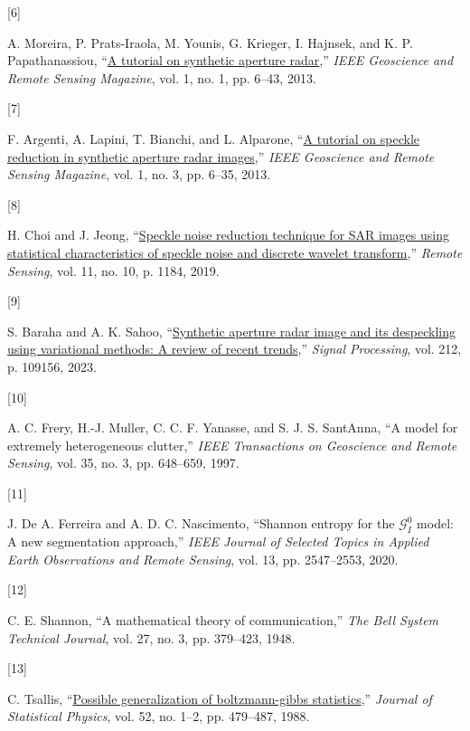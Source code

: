 \documentclass[
  lettersize  journal,
]{IEEEtran}%
\newlength{\cslhangindent}
\newlength{\csllabelwidth}
\newenvironment{CSLReferences}[2] %
 {\begin{list}{}{%
  \setlength{\itemindent}{0pt}
  \setlength{\leftmargin}{0pt}
  \setlength{\parsep}{0pt}
  \ifodd #1
   \setlength{\leftmargin}{\cslhangindent}
   \setlength{\itemindent}{-1\cslhangindent}
  \fi
  \setlength{\itemsep}{#2\baselineskip}}}
 {\end{list}}
\newcommand{\CSLLeftMargin}[1]{\parbox[t]{\csllabelwidth}{\strut#1\strut}}
\newcommand{\CSLRightInline}[1]{\parbox[t]{\linewidth - \csllabelwidth}{\strut#1\strut}}
\begin{document}
\begin{CSLReferences}{0}{0}
\CSLLeftMargin{{[}6{]} }%
\CSLRightInline{A. Moreira, P. Prats-Iraola, M. Younis, G. Krieger, I.
Hajnsek, and K. P. Papathanassiou,
{``\href{https://doi.org/10.1109/mgrs.2013.2248301}{A tutorial on
synthetic aperture radar},''} \emph{IEEE Geoscience and Remote Sensing
Magazine}, vol. 1, no. 1, pp. 6--43, 2013. }

\CSLLeftMargin{{[}7{]} }%
\CSLRightInline{F. Argenti, A. Lapini, T. Bianchi, and L. Alparone,
{``\href{https://doi.org/10.1109/mgrs.2013.2277512}{A tutorial on
speckle reduction in synthetic aperture radar images},''} \emph{IEEE
Geoscience and Remote Sensing Magazine}, vol. 1, no. 3, pp. 6--35, 2013.
}

\CSLLeftMargin{{[}8{]} }%
\CSLRightInline{H. Choi and J. Jeong,
{``\href{https://doi.org/10.3390/rs11101184}{Speckle noise reduction
technique for SAR images using statistical characteristics of speckle
noise and discrete wavelet transform},''} \emph{Remote Sensing}, vol.
11, no. 10, p. 1184, 2019. }

\CSLLeftMargin{{[}9{]} }%
\CSLRightInline{S. Baraha and A. K. Sahoo,
{``\href{https://doi.org/10.1016/j.sigpro.2023.109156}{Synthetic
aperture radar image and its despeckling using variational methods: A
review of recent trends},''} \emph{Signal Processing}, vol. 212, p.
109156, 2023. }

\CSLLeftMargin{{[}10{]} }%
\CSLRightInline{A. C. Frery, H.-J. Muller, C. C. F. Yanasse, and S. J.
S. SantAnna, {``A model for extremely heterogeneous clutter,''}
\emph{{IEEE} Transactions on Geoscience and Remote Sensing}, vol. 35,
no. 3, pp. 648--659, 1997. }

\CSLLeftMargin{{[}11{]} }%
\CSLRightInline{J. De A. Ferreira and A. D. C. Nascimento, {``Shannon
entropy for the {\(\mathcal {G}^0_{I}\)} model: A new segmentation
approach,''} \emph{{IEEE} Journal of Selected Topics in Applied Earth
Observations and Remote Sensing}, vol. 13, pp. 2547--2553, 2020. }

\CSLLeftMargin{{[}12{]} }%
\CSLRightInline{C. E. Shannon, {``A mathematical theory of
communication,''} \emph{The Bell System Technical Journal}, vol. 27, no.
3, pp. 379--423, 1948. }

\CSLLeftMargin{{[}13{]} }%
\CSLRightInline{C. Tsallis,
{``\href{https://doi.org/10.1007/bf01016429}{Possible generalization of
boltzmann-gibbs statistics},''} \emph{Journal of Statistical Physics},
vol. 52, no. 1--2, pp. 479--487, 1988. }


\end{CSLReferences}
\end{document}
